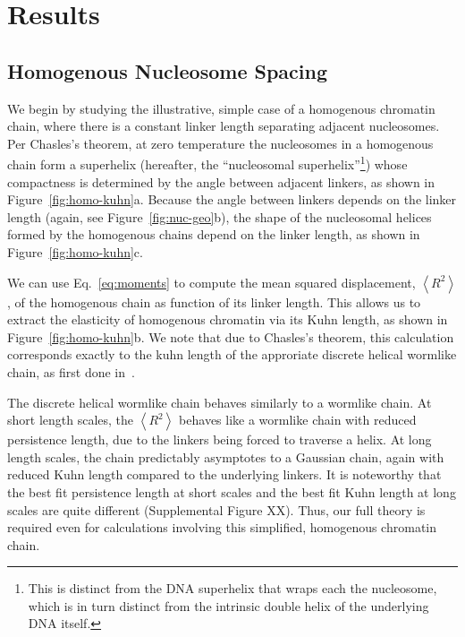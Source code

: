 \documentclass[%
 reprint,
superscriptaddress,
showpacs,preprintnumbers,
 amsmath,amssymb,
 aps,
 prl,
]{revtex4-1}
\newcommand{\RR}{\left\langle{}R^2\right\rangle{}}
\begin{document}
\section{\label{sec:model}Results}
\subsection{\label{sec:homo-kuhn}Homogenous Nucleosome Spacing}

We begin by studying the illustrative, simple case of a homogenous chromatin
    chain, where there is a constant linker length separating adjacent
    nucleosomes.
Per Chasles's theorem, at zero temperature the nucleosomes in a homogenous chain
    form a superhelix (hereafter, the ``nucleosomal superhelix''\footnote{%
        This is distinct from the DNA superhelix that wraps each the nucleosome,
        which is in turn distinct from the intrinsic double helix of the
        underlying DNA itself.})
    whose compactness is determined by the angle between adjacent linkers, as
    shown in Figure~\ref{fig:homo-kuhn}a.
Because the angle between linkers depends on the linker length (again, see
    Figure~\ref{fig:nuc-geo}b), the shape of the nucleosomal helices formed by
    the homogenous chains depend on the linker length, as shown in
    Figure~\ref{fig:homo-kuhn}c.

We can use Eq.~\ref{eq:moments} to compute the mean squared displacement, $\RR$,
    of the homogenous chain as function of its linker length.
This allows us to extract the elasticity of homogenous chromatin via its Kuhn
    length, as shown in Figure~\ref{fig:homo-kuhn}b.
We note that due to Chasles's theorem, this calculation corresponds exactly to
    the kuhn length of the approriate discrete helical wormlike chain, as first
    done in~\cite{yamakawa1976}.

The discrete helical wormlike chain behaves similarly to a wormlike chain.
At short length scales, the $\RR$ behaves like a wormlike chain with reduced
    persistence length, due to the linkers being forced to traverse a helix.
At long length scales, the chain predictably asymptotes to a Gaussian
    chain, again with reduced Kuhn length compared to the underlying linkers.
It is noteworthy that the best fit persistence length at short scales and the
    best fit Kuhn length at long scales are quite different (Supplemental Figure
    XX).
Thus, our full theory is required even for calculations involving this
    simplified, homogenous chromatin chain.
\end{document}
